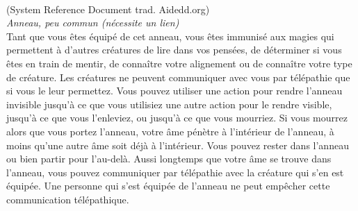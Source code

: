 \\
{\small (System Reference Document trad. Aidedd.org)}\\
{\small \it Anneau, peu commun (nécessite un lien)}\\
Tant que vous êtes équipé de cet anneau, vous êtes immunisé aux magies qui permettent à d'autres créatures de lire dans vos pensées, de déterminer si vous êtes en train de mentir, de connaître votre alignement ou de connaître votre type de créature. Les créatures ne peuvent communiquer avec vous par télépathie que si vous le leur permettez.
Vous pouvez utiliser une action pour rendre l'anneau invisible jusqu'à ce que vous utilisiez une autre action pour le rendre visible, jusqu'à ce que vous l'enleviez, ou jusqu'à ce que vous mourriez.
Si vous mourrez alors que vous portez l'anneau, votre âme pénètre à l'intérieur de l'anneau, à moins qu'une autre âme soit déjà à l'intérieur. Vous pouvez rester dans l'anneau ou bien partir pour l'au-delà. Aussi longtemps que votre âme se trouve dans l'anneau, vous pouvez communiquer par télépathie avec la créature qui s'en est équipée. Une personne qui s'est équipée de l'anneau ne peut empêcher cette communication télépathique. \\

